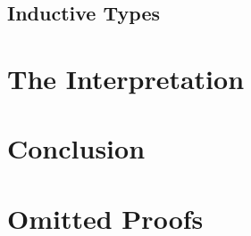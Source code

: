 \documentclass[a4paper,UKenglish,cleveref, autoref,numberwithinsect]{lipics-v2019}
\begin{document}
\subsection{Inductive Types}


\section{The Interpretation}


\section{Conclusion}

\appendix
\section{Omitted Proofs}





\end{document}
